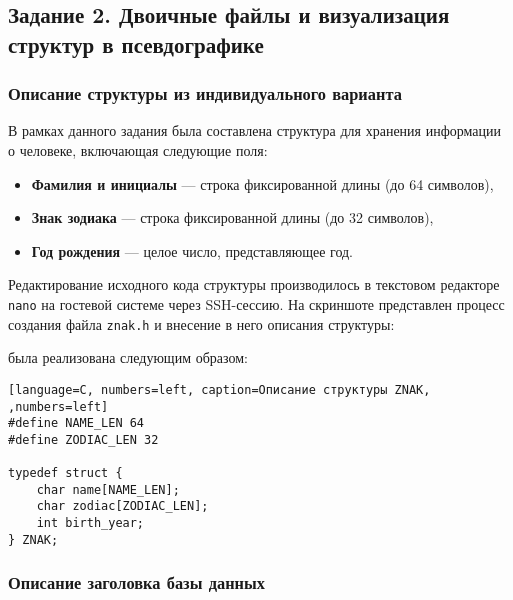 \subsection{Задание 2. Двоичные файлы и визуализация структур в псевдографике}

\subsubsection*{Описание структуры из индивидуального варианта}

В рамках данного задания была составлена структура для хранения информации о человеке, включающая следующие поля:
\begin{itemize}
  \item \textbf{Фамилия и инициалы} --- строка фиксированной длины (до 64 символов),
  \item \textbf{Знак зодиака} --- строка фиксированной длины (до 32 символов),
  \item \textbf{Год рождения} --- целое число, представляющее год.
\end{itemize}

Редактирование исходного кода структуры производилось в текстовом редакторе \texttt{nano} на гостевой системе через SSH-сессию. На скриншоте представлен процесс создания файла \texttt{znak.h} и внесение в него описания структуры:


 была реализована следующим образом:
\begin{lstlisting}[language=C, numbers=left, caption=Описание структуры ZNAK, ,numbers=left]
#define NAME_LEN 64
#define ZODIAC_LEN 32

typedef struct {
    char name[NAME_LEN];
    char zodiac[ZODIAC_LEN];
    int birth_year;
} ZNAK;
\end{lstlisting}

\subsubsection*{Описание заголовка базы данных}

